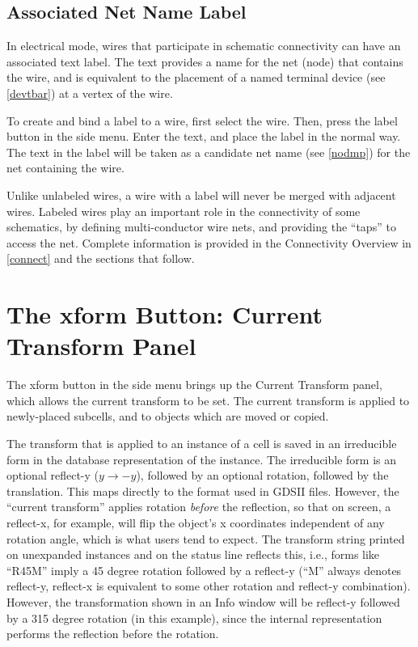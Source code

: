 \subsection{Associated Net Name Label}

In electrical mode, wires that participate in schematic connectivity
can have an associated text label.  The text provides a name for the
net (node) that contains the wire, and is equivalent to the placement
of a named terminal device (see \ref{devtbar}) at a vertex of the
wire.

To create and bind a label to a wire, first select the wire.  Then,
press the {\cb label} button in the side menu.  Enter the text, and
place the label in the normal way.  The text in the label will be
taken as a candidate net name (see \ref{nodmp}) for the net containing
the wire.

Unlike unlabeled wires, a wire with a label will never be merged with
adjacent wires.  Labeled wires play an important role in the
connectivity of some schematics, by defining multi-conductor wire
nets, and providing the ``taps'' to access the net.  Complete
information is provided in the Connectivity Overview in \ref{connect}
and the sections that follow.


\section{The {\cb xform} Button: Current Transform Panel}
\label{curxform}

The {\cb xform} button in the side menu brings up the {\cb Current
Transform} panel, which allows the current transform to be set.  The
current transform is applied to newly-placed subcells, and to objects
which are moved or copied.

The transform that is applied to an instance of a cell is saved in an
irreducible form in the database representation of the instance.  The
irreducible form is an optional reflect-y ($y \rightarrow -y$),
followed by an optional rotation, followed by the translation.  This
maps directly to the format used in GDSII files.  However, the
``current transform'' applies rotation {\it before} the reflection, so
that on screen, a reflect-x, for example, will flip the object's x
coordinates independent of any rotation angle, which is what users
tend to expect.  The transform string printed on unexpanded instances
and on the status line reflects this, i.e., forms like ``{\vt R45M}''
imply a 45 degree rotation followed by a reflect-y (``{\vt M}'' always
denotes reflect-y, reflect-x is equivalent to some other rotation and
reflect-y combination).  However, the transformation shown in an {\cb
Info} window will be reflect-y followed by a 315 degree rotation (in
this example), since the internal representation performs the
reflection before the rotation.

